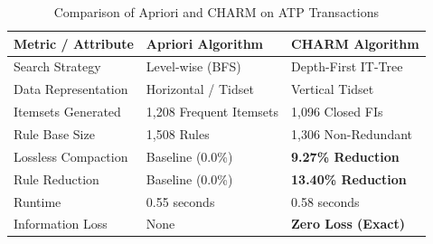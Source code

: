\documentclass[10pt,journal]{IEEEtran}
\begin{document}
\begin{table}[!t]
\renewcommand{\arraystretch}{1.10}
\caption{Comparison of Apriori and CHARM on ATP Transactions}
\label{tab:arm_comp}
\centering
\footnotesize
\begin{tabularx}{\columnwidth}{@{}l Y Y@{}}
\toprule
\textbf{Metric / Attribute} & \textbf{Apriori Algorithm} & \textbf{CHARM Algorithm} \\
\midrule
Search Strategy & Level-wise (BFS) & Depth-First IT-Tree \\
Data Representation & Horizontal / Tidset & Vertical Tidset \\
Itemsets Generated & 1,208 Frequent Itemsets & 1,096 Closed FIs \\
Rule Base Size & 1,508 Rules & 1,306 Non-Redundant \\
Lossless Compaction & Baseline (0.0\%) & \textbf{9.27\% Reduction} \\
Rule Reduction & Baseline (0.0\%) & \textbf{13.40\% Reduction} \\
Runtime & 0.55 seconds & 0.58 seconds \\
Information Loss & None & \textbf{Zero Loss (Exact)} \\
\bottomrule
\end{tabularx}
\end{table}
\end{document}
